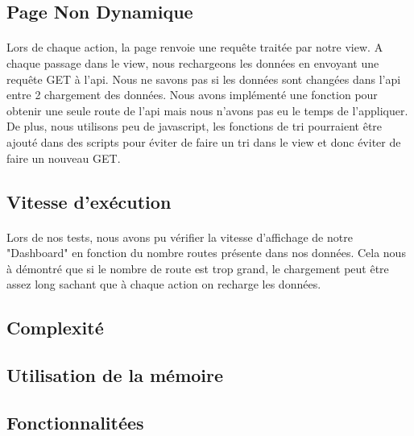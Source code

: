 \subsection{Page Non Dynamique}
\paragraph{}Lors de chaque action, la page renvoie une requête traitée par notre view. A chaque passage dans le view, nous rechargeons les données en envoyant une requête GET à l'api. Nous ne savons pas si les données sont changées dans l'api entre 2 chargement des données. Nous avons implémenté une fonction pour obtenir une seule route de l'api mais nous n'avons pas eu le temps de l'appliquer.
De plus, nous utilisons peu de javascript, les fonctions de tri pourraient être ajouté dans des scripts pour éviter de faire un tri dans le view et donc éviter de faire un nouveau GET. 

\subsection{Vitesse d'exécution}




\paragraph{}Lors de nos tests, nous avons pu vérifier la vitesse d'affichage de notre "Dashboard" en fonction du nombre routes présente dans nos données. Cela nous à démontré que si le nombre de route est trop grand, le chargement peut être assez long sachant que à chaque action on recharge les données.

\subsection{Complexité}

\subsection{Utilisation de la mémoire}

\subsection{Fonctionnalitées}

